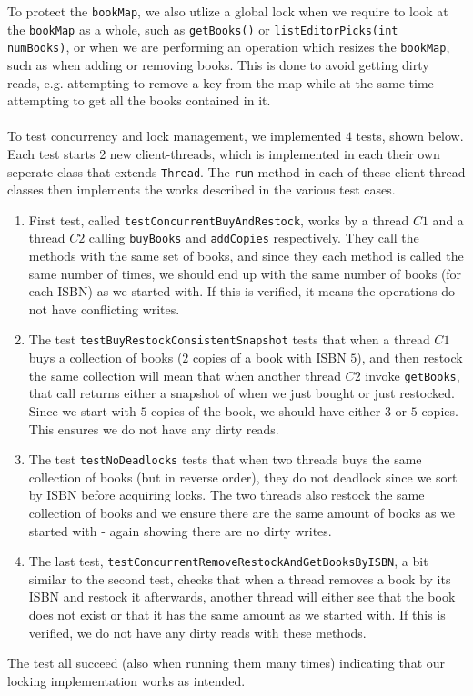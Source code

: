 \documentclass[a4paper]{article}
\begin{document}
To protect the \texttt{bookMap}, we also utlize a global lock when we require to look at the \texttt{bookMap} as a whole, such as \texttt{getBooks()} or \texttt{listEditorPicks(int numBooks)}, or when we are performing an operation which resizes the \texttt{bookMap}, such as when adding or removing books. This is done to avoid getting dirty reads, e.g. attempting to remove a key from the map while at the same time attempting to get all the books contained in it.
\\ \\
To test concurrency and lock management, we implemented $4$ tests, shown below. Each test starts 2 new client-threads, which is implemented in each their own seperate class that extends \texttt{Thread}. The \texttt{run} method in each of these client-thread classes then implements the works described in the various test cases.
\begin{enumerate}
\item First test, called \texttt{testConcurrentBuyAndRestock}, works by a thread $C1$ and a thread $C2$ calling \texttt{buyBooks} and \texttt{addCopies} respectively. They call the methods with the same set of books, and since they each method is called the same number of times, we should end up with the same number of books (for each ISBN) as we started with. If this is verified, it means the operations do not have conflicting writes.
\item The test \texttt{testBuyRestockConsistentSnapshot} tests that when a thread $C1$ buys a collection of books ($2$ copies of a book with ISBN $5$), and then restock the same collection will mean that when another thread $C2$ invoke \texttt{getBooks}, that call returns either a snapshot of when we just bought or just restocked. Since we start with $5$ copies of the book, we should have either $3$ or $5$ copies. This ensures we do not have any dirty reads.
\item The test \texttt{testNoDeadlocks} tests that when two threads buys the same collection of books (but in reverse order), they do not deadlock since we sort by ISBN before acquiring locks. The two threads also restock the same collection of books and we ensure there are the same amount of books as we started with - again showing there are no dirty writes.
\item The last test, \texttt{testConcurrentRemoveRestockAndGetBooksByISBN}, a bit similar to the second test, checks that when a thread removes a book by its ISBN and restock it afterwards, another thread will either see that the book does not exist or that it has the same amount as we started with. If this is verified, we do not have any dirty reads with these methods.
\end{enumerate}
The test all succeed (also when running them many times) indicating that our locking implementation works as intended.
\end{document}
